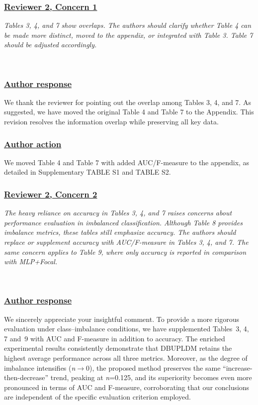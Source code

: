 \documentclass[journal,12pn, onecolumn]{IEEEtran}
\begin{document}
\textcolor{customgreen}{
\subsubsection*{\underline{\textbf{Reviewer 2, Concern 1}}}
\emph{Tables 3, 4, and 7 show overlaps. The authors should clarify whether Table 4 can be made more distinct, moved to the appendix, or integrated with Table 3. Table 7 should be adjusted accordingly. 
}
}\\

{\color{black}
\subsubsection*{\textbf{\underline{Author response }}}
We thank the reviewer for pointing out the overlap among Tables 3, 4, and 7. As suggested, we have moved the original Table 4 and Table 7 to the Appendix. This revision resolves the information overlap while preserving all key data.\\


{\color{black}
\subsubsection*{\textbf{\underline{Author action}}}
We moved Table 4 and Table 7 with added AUC/F-measure to the appendix, as detailed in Supplementary TABLE S1 and TABLE S2.




\textcolor{customgreen}{
\subsubsection*{\underline{\textbf{Reviewer 2, Concern 2}}}
\emph{The heavy reliance on accuracy in Tables 3, 4, and 7 raises concerns about performance evaluation in imbalanced classification. Although Table 8 provides imbalance metrics, these tables still emphasize accuracy. The authors should replace or supplement accuracy with AUC/F-measure in Tables 3, 4, and 7. The same concern applies to Table 9, where only accuracy is reported in comparison with MLP+Focal.
}}\\

{\color{black}
\subsubsection*{\textbf{\underline{Author response }}}
We sincerely appreciate your insightful comment.
To provide a more rigorous evaluation under class--imbalance conditions, we have supplemented Tables~3, 4, 7 and~9 with AUC and F-measure in addition to accuracy.
The enriched experimental results consistently demonstrate that DBUPLDM retains the highest average performance across all three metrics.
Moreover, as the degree of imbalance intensifies (\textit{n}$\to$0), the proposed method preserves the same ``increase-then-decrease'' trend, peaking at \textit{n}=0.125, and its superiority becomes even more pronounced in terms of AUC and F-measure, corroborating that our conclusions are independent of the specific evaluation criterion employed.
}\\

}}
\end{document}
